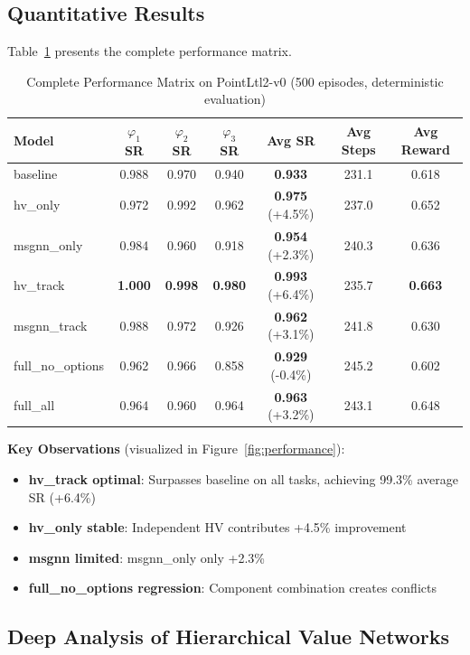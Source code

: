 \documentclass[conference]{IEEEtran}
\begin{document}
\subsection{Quantitative Results}

Table~\ref{tab:overall_performance} presents the complete performance matrix.

\begin{table}[t]
\centering
\caption{Complete Performance Matrix on PointLtl2-v0 (500 episodes, deterministic evaluation)}
\label{tab:overall_performance}
\begin{tabular}{@{}lcccccc@{}}
\toprule
\textbf{Model} & \textbf{$\varphi_1$ SR} & \textbf{$\varphi_2$ SR} & \textbf{$\varphi_3$ SR} & \textbf{Avg SR} & \textbf{Avg Steps} & \textbf{Avg Reward} \\ \midrule
baseline & 0.988 & 0.970 & 0.940 & \textbf{0.933} & 231.1 & 0.618 \\
hv\_only & 0.972 & 0.992 & 0.962 & \textbf{0.975} (+4.5\%) & 237.0 & 0.652 \\
msgnn\_only & 0.984 & 0.960 & 0.918 & \textbf{0.954} (+2.3\%) & 240.3 & 0.636 \\
hv\_track & \textbf{1.000} & \textbf{0.998} & \textbf{0.980} & \textbf{0.993} (+6.4\%) & 235.7 & \textbf{0.663} \\
msgnn\_track & 0.988 & 0.972 & 0.926 & \textbf{0.962} (+3.1\%) & 241.8 & 0.630 \\
full\_no\_options & 0.962 & 0.966 & 0.858 & \textbf{0.929} (-0.4\%) & 245.2 & 0.602 \\
full\_all & 0.964 & 0.960 & 0.964 & \textbf{0.963} (+3.2\%) & 243.1 & 0.648 \\ \bottomrule
\end{tabular}
\end{table}

\textbf{Key Observations} (visualized in Figure~\ref{fig:performance}):
\begin{itemize}
    \item \textbf{hv\_track optimal}: Surpasses baseline on all tasks, achieving 99.3\% average SR (+6.4\%)
    \item \textbf{hv\_only stable}: Independent HV contributes +4.5\% improvement
    \item \textbf{msgnn limited}: msgnn\_only only +2.3\%
    \item \textbf{full\_no\_options regression}: Component combination creates conflicts
\end{itemize}

\subsection{Deep Analysis of Hierarchical Value Networks}
\end{document}
